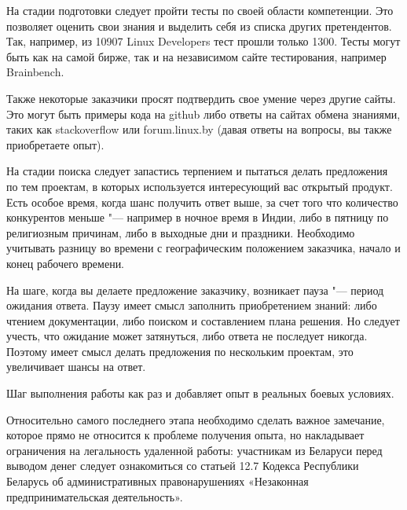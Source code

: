 \documentclass[10pt, a5paper]{article}
\begin{document}
На стадии подготовки следует пройти тесты по своей области компетенции. Это позволяет оценить свои знания и выделить себя из списка других претендентов. Так, например, из 10907 Linux Developers тест прошли только 1300. Тесты могут быть как на самой бирже, так и на независимом сайте тестирования, например Brainbench.

Также некоторые заказчики просят подтвердить свое умение через другие сайты. Это могут быть примеры кода на github либо ответы на сайтах обмена знаниями, таких как stackoverflow или forum.linux.by (давая ответы на вопросы, вы также приобретаете опыт).

На стадии поиска следует запастись терпением и пытаться делать предложения по тем проектам, в которых используется интересующий вас открытый продукт. Есть особое время, когда шанс получить ответ выше, за счет того что количество конкурентов меньше "--- например в ночное время в Индии, либо в пятницу по религиозным причинам, либо в выходные дни и праздники. Необходимо учитывать разницу во времени с географическим положением заказчика, начало и конец рабочего времени.

На шаге, когда вы делаете предложение заказчику, возникает пауза "--- период ожидания ответа. Паузу имеет смысл заполнить приобретением знаний: либо чтением документации, либо поиском и составлением плана решения. Но следует учесть, что ожидание может затянуться, либо ответа не последует никогда. Поэтому имеет смысл делать предложения по нескольким проектам, это увеличивает шансы на ответ.

Шаг выполнения работы как раз и добавляет опыт в реальных боевых условиях.

Относительно самого последнего этапа необходимо сделать важное замечание, которое прямо не относится к проблеме получения опыта, но накладывает ограничения на легальность удаленной работы: участникам из Беларуси перед выводом денег следует ознакомиться со статьей 12.7 Кодекса Республики Беларусь об административных правонарушениях «Незаконная предпринимательская деятельность».
\end{document}
